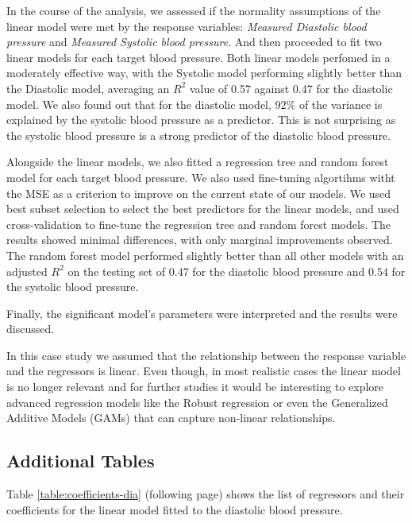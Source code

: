 \documentclass[12 pt]{scrartcl}
\numberwithin{equation}{section}
\begin{document}
In the course of the analysis, 
we assessed if the normality assumptions of the linear model were met by the response variables:
\textit{Measured Diastolic blood pressure} and \textit{Measured Systolic blood pressure}.
And then proceeded to fit two linear models for each target blood pressure.
Both linear models perfomed in a moderately effective way,
with the Systolic model performing slightly better than the Diastolic model, averaging an $R^2$ value of 0.57 against
0.47 for the diastolic model. 
We also found out that for the diastolic model, $92\%$ of the variance is explained by the systolic blood pressure as a predictor.
This is not surprising as the systolic blood pressure is a strong predictor of the diastolic blood pressure.

Alongside the linear models, we also fitted a regression tree and random forest model for each target blood pressure.
We also used fine-tuning algortihms witht the MSE as a criterion to improve on the current state of our models.
We used best subset selection to select the best predictors for the linear models, and
used cross-validation to fine-tune the regression tree and random forest models.
The results showed minimal differences, with only marginal improvements observed. 
The random forest model performed slightly better than all other models with an adjusted $R^2$ 
on the testing set of $0.47$ for the diastolic blood pressure and $0.54$ for the systolic blood pressure. 

Finally, the significant model's parameters were interpreted and the results were discussed.

In this case study we assumed that the relationship between the response variable and the regressors is linear.
Even though, in most realistic cases the linear model is no longer relevant and for further studies it would be interesting
to explore advanced regression models like the Robust regression or even the Generalized Additive Models (GAMs) that can capture non-linear relationships.


\newpage
{}
\renewcommand\refname{Bibliography} 



\appendix 
{}

\subsection*{Additional Tables}

Table \ref{table:coefficients-dia} (following page) shows the list of regressors and their coefficients for the linear model fitted to the diastolic blood pressure.
\end{document}
